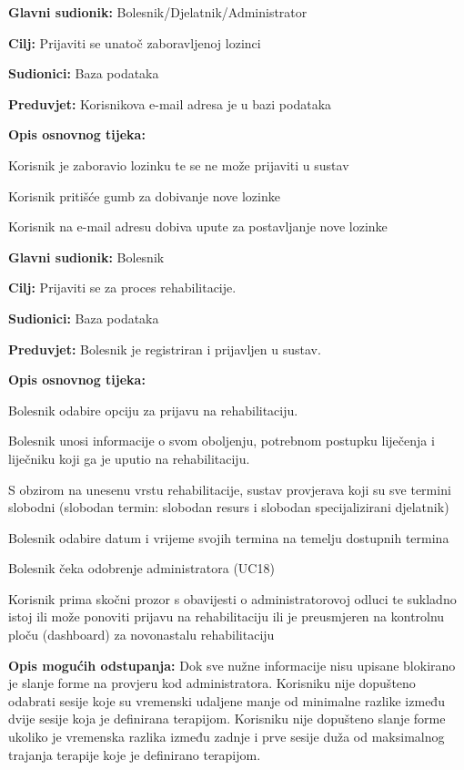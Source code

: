	\item \textbf{Glavni sudionik:} Bolesnik/Djelatnik/Administrator
 	\item \textbf{Cilj:} Prijaviti se unatoč zaboravljenoj lozinci
  	\item \textbf{Sudionici:} Baza podataka
   	\item \textbf{Preduvjet:} Korisnikova e-mail adresa je u bazi podataka
    	\item \textbf{Opis osnovnog tijeka:}
     	\begin{packed_enum}
      		\item Korisnik je zaboravio lozinku te se ne može prijaviti u sustav
		\item Korisnik pritišće gumb za dobivanje nove lozinke
  		\item Korisnik na e-mail adresu dobiva upute za postavljanje nove lozinke
    	\end{packed_enum}
\closeusecase


	\item \textbf{Glavni sudionik:} Bolesnik
	\item \textbf{Cilj:} Prijaviti se za proces rehabilitacije.
	\item \textbf{Sudionici:} Baza podataka
	\item \textbf{Preduvjet:} Bolesnik je registriran i prijavljen u sustav.
	\item \textbf{Opis osnovnog tijeka:}
	\begin{packed_enum}
		\item Bolesnik odabire opciju za prijavu na rehabilitaciju.
		\item Bolesnik unosi informacije o svom oboljenju, potrebnom postupku liječenja i liječniku koji ga je uputio na rehabilitaciju.
        	\item S obzirom na unesenu vrstu rehabilitacije, sustav provjerava koji su sve termini slobodni (slobodan termin: slobodan resurs i slobodan specijalizirani djelatnik) 
		\item Bolesnik odabire datum i vrijeme svojih termina na temelju dostupnih termina 
        	\item Bolesnik čeka odobrenje administratora (UC18) 
        	\item Korisnik prima skočni prozor s obavijesti o administratorovoj odluci te sukladno istoj ili može ponoviti prijavu na rehabilitaciju ili je preusmjeren na kontrolnu ploču (dashboard) za novonastalu rehabilitaciju
	\end{packed_enum}
	\item \textbf{Opis mogućih odstupanja:}
	Dok sve nužne informacije nisu upisane blokirano je slanje forme na provjeru kod administratora. 
    Korisniku nije dopušteno odabrati sesije koje su vremenski udaljene manje od minimalne razlike između dvije sesije koja je definirana terapijom. 
    Korisniku nije dopušteno slanje forme ukoliko je vremenska razlika između zadnje i prve sesije duža od maksimalnog trajanja terapije koje je definirano terapijom.
\closeusecase


